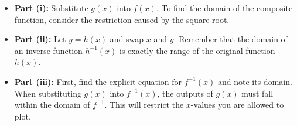 \begin{hint}
\begin{itemize}[leftmargin=*]
    \item \textbf{Part (i):} Substitute $g(x)$ into $f(x)$. To find the domain of the composite function, consider the restriction caused by the square root. 
    \item \textbf{Part (ii):} Let $y = h(x)$ and swap $x$ and $y$. Remember that the domain of an inverse function $h^{-1}(x)$ is exactly the range of the original function $h(x)$.
    \item \textbf{Part (iii):} First, find the explicit equation for $f^{-1}(x)$ and note its domain. When substituting $g(x)$ into $f^{-1}(x)$, the outputs of $g(x)$ must fall within the domain of $f^{-1}$. This will restrict the $x$-values you are allowed to plot.
\end{itemize}
\end{hint}

